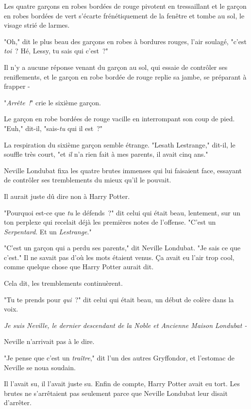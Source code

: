 Les quatre garçons en robes bordées de rouge pivotent en tressaillant et le garçon en robes bordées de vert s'écarte frénétiquement de la fenêtre et tombe au sol, le visage strié de larmes.

"Oh," dit le plus beau des garçons en robes à bordures rouges, l'air soulagé, "c'est \emph{toi}~? Hé, Lessy, tu sais qui c'est~?"

Il n'y a aucune réponse venant du garçon au sol, qui essaie de contrôler ses reniflements, et le garçon en robe bordée de rouge replie sa jambe, se préparant à frapper -

"\emph{Arrête~!}" crie le sixième garçon.

Le garçon en robe bordées de rouge vacille en interrompant son coup de pied. "Euh," dit-il, "sais-\emph{tu} qui il est~?"

La respiration du sixième garçon semble étrange. "Lesath Lestrange," dit-il, le souffle très court, "et \emph{il} n'a rien fait à mes parents, il avait cinq ans."

\later

Neville Londubat fixa les quatre brutes immenses qui lui faisaient face, essayant de contrôler ses tremblements du mieux qu'il le pouvait.

Il aurait juste dû dire non à Harry Potter.

"Pourquoi est-ce que \emph{tu} le défends~?" dit celui qui était beau, lentement, sur un ton perplexe qui recelait déjà les premières notes de l'offense. "C'est un \emph{Serpentard}. Et un \emph{Lestrange}."

"C'est un garçon qui a perdu ses parents," dit Neville Londubat. "Je sais ce que c'est." Il ne savait pas d'où les mots étaient venus. Ça avait eu l'air trop cool, comme quelque chose que Harry Potter aurait dit.

Cela dit, les tremblements continuèrent.

"Tu te prends pour \emph{qui}~?" dit celui qui était beau, un début de colère dans la voix.

\emph{Je suis Neville, le dernier descendant de la Noble et Ancienne Maison Londubat -}

Neville n'arrivait pas à le dire.

"Je pense que c'est un \emph{traître}," dit l'un des autres Gryffondor, et l'estomac de Neville se noua soudain.

Il l'avait su, il l'avait juste su. Enfin de compte, Harry Potter avait eu tort. Les brutes ne s'arrêtaient pas seulement parce que Neville Londubat leur disait d'arrêter.

